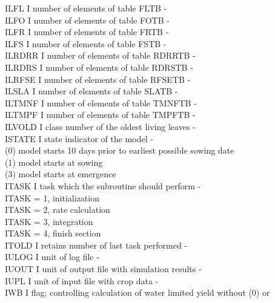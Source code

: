 \documentclass[11pt]{article}
\begin{document}
\begin{tabbing}
ILFL\> \> I\> number of elements of table FLTB\> \> \> \> \> \> \> -\\
ILFO\> \> I\> number of elements of table FOTB\> \> \> \> \> \> \> -\\
ILFR\> \> I\> number of elements of table FRTB\> \> \> \> \> \> \> -\\
ILFS\> \> I\> number of elements of table FSTB\> \> \> \> \> \> \> -\\
ILRDRR\> \> I\> number of elements of table RDRRTB\> \> \> \> \> \> \> -\\
ILRDRS\> \> I\> number of elements of table RDRSTB\> \> \> \> \> \> \> -\\
ILRFSE\> \> I\> number of elements of table RFSETB\> \> \> \> \> \> \> -\\
ILSLA\> \> I\> number of elements of table SLATB\> \> \> \> \> \> \> -\\
ILTMNF\> \> I\> number of elements of table TMNFTB\> \> \> \> \> \> \> -\\
ILTMPF\> \> I\> number of elements of table TMPFTB\> \> \> \> \> \> \> -\\
ILVOLD  \> \> I   \> class number of the oldest living leaves           \> \> \> \> \> \> \> -\\
ISTATE\> \> I\> state indicator of the model\> \> \> \> \> \> \> -\\
\>\> \> (0) model starts 10 days prior to earliest possible sowing date\\
\>\> \> (1) model starts at sowing\\
\>\> \> (3) model starts at emergence\\
ITASK\> \> I\> task which the subroutine should perform\> \> \> \> \> \> \> -\\
\>\> \> ITASK = 1, initialization\\
\>\> \> ITASK = 2, rate calculation\\
\>\> \> ITASK = 3, integration\\
\>\> \> ITASK = 4, finish section\\
ITOLD\> \> I\> retains number of last task performed\> \> \> \> \> \> \> -\\
IULOG\> \> I\> unit of log file\> \> \> \> \> \> \> -\\
IUOUT\> \> I\> unit of output file with simulation results\> \> \> \> \> \> \> -\\
IUPL\> \> I \> unit of input file with crop data\> \> \> \> \> \> \> -\\
IWB     \> \> I\> flag; controlling calculation of water limited yield without (0) or \\

\end{tabbing}
\end{document}
